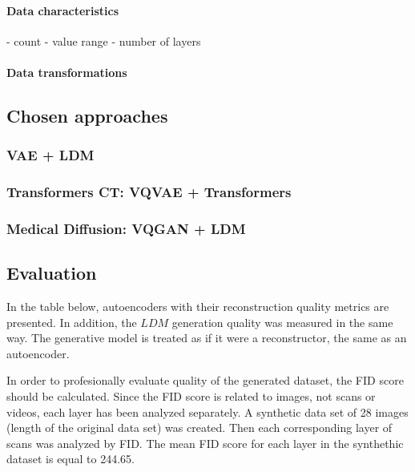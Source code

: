 \paragraph{Data characteristics}
- count
- value range
- number of layers
\paragraph{Data transformations}

\newpage
\subsection{Chosen approaches}
\subsubsection{VAE + LDM}


\newpage
\subsubsection{Transformers CT: VQVAE + Transformers}

\newpage
\subsubsection{Medical Diffusion: VQGAN + LDM}


\subsection{Evaluation}

In the table below, autoencoders with their reconstruction quality metrics are presented. 
In addition, the $LDM$ generation quality was measured in the same way. The generative model is treated as if it were a reconstructor, the same as an autoencoder.

In order to profesionally evaluate quality of the generated dataset, the FID score should be calculated. Since the FID score is related to images, not scans or videos, each layer has been analyzed separately. 
A synthetic data set of 28 images (length of the original data set) was created. Then each corresponding layer of scans was analyzed by FID. The mean FID score for each layer in the synthethic dataset is equal to 244.65. 

